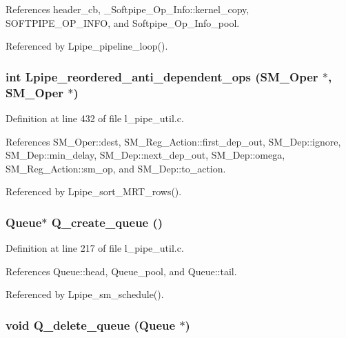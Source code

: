 References header\_\-cb, \_\-Softpipe\_\-Op\_\-Info::kernel\_\-copy, SOFTPIPE\_\-OP\_\-INFO, and Softpipe\_\-Op\_\-Info\_\-pool.

Referenced by Lpipe\_\-pipeline\_\-loop().
\subsubsection{\setlength{\rightskip}{0pt plus 5cm}int Lpipe\_\-reordered\_\-anti\_\-dependent\_\-ops (\bf{SM\_\-Oper} $\ast$, \bf{SM\_\-Oper} $\ast$)}\label{l__pipe__util_8h_7b60097f302ea9ca9d9c2bda114cd370}




Definition at line 432 of file l\_\-pipe\_\-util.c.

References SM\_\-Oper::dest, SM\_\-Reg\_\-Action::first\_\-dep\_\-out, SM\_\-Dep::ignore, SM\_\-Dep::min\_\-delay, SM\_\-Dep::next\_\-dep\_\-out, SM\_\-Dep::omega, SM\_\-Reg\_\-Action::sm\_\-op, and SM\_\-Dep::to\_\-action.

Referenced by Lpipe\_\-sort\_\-MRT\_\-rows().
\subsubsection{\setlength{\rightskip}{0pt plus 5cm}\bf{Queue}$\ast$ Q\_\-create\_\-queue ()}\label{l__pipe__util_8h_cdc1d20712bda5896582534b68c4acbf}




Definition at line 217 of file l\_\-pipe\_\-util.c.

References Queue::head, Queue\_\-pool, and Queue::tail.

Referenced by Lpipe\_\-sm\_\-schedule().
\subsubsection{\setlength{\rightskip}{0pt plus 5cm}void Q\_\-delete\_\-queue (\bf{Queue} $\ast$)}\label{l__pipe__util_8h_11ae875063d836b46f834dde6210bc16}




